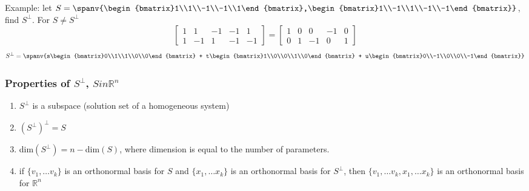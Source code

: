 \documentclass[12pt]{article}
\newcommand{\R}[1]{\mathbb{R}^{#1}}
\begin{document}
Example: let $S = \spanv{\begin{bmatrix}1\\1\\-1\\-1\\1\end{bmatrix},\begin{bmatrix}1\\-1\\1\\-1\\-1\end{bmatrix}}$, find $S^\perp$. For $S \neq S^\perp$ \[ \begin{bmatrix}1&1&-1&-1&1\\1&-1&1&-1&-1\end{bmatrix} = \begin{bmatrix}1&0&0&-1&0\\0&1&-1&0&1\end{bmatrix} \] \[ S^\perp = \spanv{s\begin{bmatrix}0\\1\\1\\0\\0\end{bmatrix} + t\begin{bmatrix}1\\0\\0\\1\\0\end{bmatrix} + u\begin{bmatrix}0\\-1\\0\\0\\-1\end{bmatrix}} \]

\subsubsection*{Properties of $S^\perp$, $Sin\R{n}$}
\begin{enumerate}
\item $S^\perp$ is a subspace (solution set of a homogeneous system)
\item $(S^\perp)^\perp = S$
\item dim$(S^\perp) = n - $dim$(S)$, where dimension is equal to the number of parameters.
\item if $\{v_1,\dots v_k\}$ is an orthonormal basis for $S$ and $\{x_1,\dots x_k\}$ is an orthonormal basis for $S^\perp$, then $\{v_1,\dots v_k,x_1,\dots x_k\}$ is an orthonormal basis for $\R{n}$
\end{enumerate}
\end{document}

